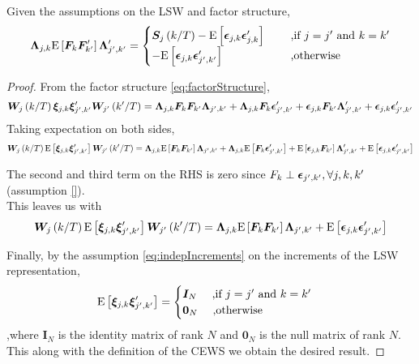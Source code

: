\documentclass[main_document.tex]{subfiles}
\begin{document}
	\begin{lemma} 
		\label{lem:lemma1}
		Given the assumptions on the LSW and factor structure, 
		\begin{align*}
			\bm{\Lambda}_{j,k} \mathrm{E}\left[\bm{F}_{k}\bm{F}_{k'}'\right] \bm{\Lambda}_{j',k'}' = 
				\begin{cases}
					\bm{S}_{j}\left(k/T\right) - \mathrm{E}\left[\bm{\epsilon}_{j,k}\bm{\epsilon}_{j,k}'\right] \quad & \text{ ,if } j=j' \text{ and } k=k' \\
					-\mathrm{E}\left[\bm{\epsilon}_{j,k}\bm{\epsilon}_{j',k'}'\right] \quad & \text{ ,otherwise }
				\end{cases}
		\end{align*}
	\end{lemma}
	\begin{proof}
		From the factor structure \eqref{eq:factorStructure}, 
		\[
		\bm{W}_{j}\left(k/T\right) \bm{\xi}_{j,k}\bm{\xi}_{j',k'}' \bm{W}_{j'}\left(k'/T\right) =  \bm{\Lambda}_{j,k} \bm{F}_{k} \bm{F}_{k'} \bm{\Lambda}_{j',k'} + \bm{\Lambda}_{j,k}\bm{F}_{k}\bm{\epsilon}_{j',k'}' + \bm{\epsilon}_{j,k}\bm{F}_{k'}\bm{\Lambda}_{j',k'}' + \bm{\epsilon}_{j,k}\bm{\epsilon}_{j',k'}'
		\]
		Taking expectation on both sides, 
		\[
		\bm{W}_{j}\left(k/T\right) \mathrm{E}\left[\bm{\xi}_{j,k}\bm{\xi}_{j',k'}'\right] \bm{W}_{j'}\left(k'/T\right) =  \bm{\Lambda}_{j,k} \mathrm{E}\left[\bm{F}_{k} \bm{F}_{k'}\right] \bm{\Lambda}_{j',k'} + \bm{\Lambda}_{j,k}\mathrm{E}\left[\bm{F}_{k}\bm{\epsilon}_{j',k'}'\right] + \mathrm{E}\left[\bm{\epsilon}_{j,k}\bm{F}_{k'}\right]\bm{\Lambda}_{j',k'}' + \mathrm{E}\left[\bm{\epsilon}_{j,k}\bm{\epsilon}_{j',k'}'\right]
		\]

		The second and third term on the RHS is zero since $F_k \perp \bm{\epsilon}_{j',k'}, \forall j,k,k'$ (assumption \eqref{}). \\
		This leaves us with 
		\[
		\bm{W}_{j}\left(k/T\right) \mathrm{E}\left[\bm{\xi}_{j,k}\bm{\xi}_{j',k'}'\right] \bm{W}_{j'}\left(k'/T\right) =  \bm{\Lambda}_{j,k} \mathrm{E}\left[\bm{F}_{k} \bm{F}_{k'}\right] \bm{\Lambda}_{j',k'} + \mathrm{E}\left[\bm{\epsilon}_{j,k}\bm{\epsilon}_{j',k'}'\right]
		\]

		Finally, by the assumption \eqref{eq:indepIncrements} on the increments of the LSW representation, 
		\[
		\mathrm{E}\left[\bm{\xi}_{j,k}\bm{\xi}_{j',k'}'\right] = 
		\begin{cases}
			\bm{I}_N  \quad \text{ ,if } j=j' \text{ and } k=k' \\
			\bm{0}_N \quad \text{ ,otherwise }
		\end{cases}
		\]
		,where $\bm{I}_N$ is the identity matrix of rank $N$ and $\bm{0}_N$ is the null matrix of rank $N$. This along with the definition of the CEWS we obtain the desired result. 
	\end{proof}
\end{document}

